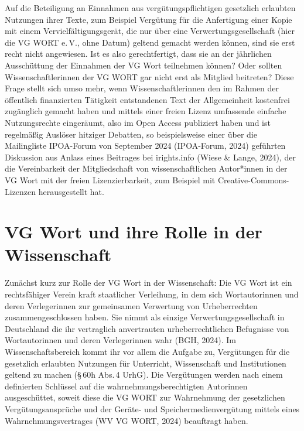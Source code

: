 \documentclass[a4paper,
fontsize=11pt,
oneside,
numbers=noperiodatend,
parskip=half-,
bibliography=totoc,
final
]{scrartcl}
\begin{document}
Auf die Beteiligung an Einnahmen aus vergütungspflichtigen gesetzlich
erlaubten Nutzungen ihrer Texte, zum Beispiel Vergütung für die
Anfertigung einer Kopie mit einem Vervielfältigungsgerät, die nur über
eine Verwertungsgesellschaft (hier die VG WORT e.\,V., ohne Datum)
geltend gemacht werden können, sind sie erst recht nicht angewiesen. Ist
es also gerechtfertigt, dass sie an der jährlichen Ausschüttung der
Einnahmen der VG Wort teilnehmen können? Oder sollten
Wissenschaftlerinnen der VG WORT gar nicht erst als Mitglied beitreten?
Diese Frage stellt sich umso mehr, wenn Wissenschaftlerinnen den im
Rahmen der öffentlich finanzierten Tätigkeit entstandenen Text der
Allgemeinheit kostenfrei zugänglich gemacht haben und mittels einer
freien Lizenz umfassende einfache Nutzungsrechte eingeräumt, also im
Open Access publiziert haben und ist regelmäßig Auslöser hitziger
Debatten, so beispielsweise einer über die Mailingliste IPOA-Forum von
September 2024 (IPOA-Forum, 2024) geführten Diskussion aus Anlass eines
Beitrages bei irights.info (Wiese \& Lange, 2024), der die Vereinbarkeit
der Mitgliedschaft von wissenschaftlichen Autor*innen in der VG Wort mit
der freien Lizenzierbarkeit, zum Beispiel mit Creative-Commons-Lizenzen
herausgestellt hat.

\section{VG Wort und ihre Rolle in der
Wissenschaft}\label{vg-wort-und-ihre-rolle-in-der-wissenschaft}

Zunächst kurz zur Rolle der VG Wort in der Wissenschaft: Die VG Wort ist
ein rechtsfähiger Verein kraft staatlicher Verleihung, in dem sich
Wortautorinnen und deren Verlegerinnen zur gemeinsamen Verwertung von
Urheberrechten zusammengeschlossen haben. Sie nimmt als einzige
Verwertungsgesellschaft in Deutschland die ihr vertraglich anvertrauten
urheberrechtlichen Befugnisse von Wortautorinnen und deren Verlegerinnen
wahr (BGH, 2024). Im Wissenschaftsbereich kommt ihr vor allem die
Aufgabe zu, Vergütungen für die gesetzlich erlaubten Nutzungen für
Unterricht, Wissenschaft und Institutionen geltend zu machen (§\,60h Abs.\,4 UrhG). Die Vergütungen werden nach einem definierten Schlüssel auf die
wahrnehmungsberechtigten Autorinnen ausgeschüttet, soweit diese die VG
WORT zur Wahrnehmung der gesetzlichen Vergütungsansprüche und der
Geräte- und Speichermedienvergütung mittels eines Wahrnehmungsvertrages
(WV VG WORT, 2024) beauftragt haben.
\end{document}
